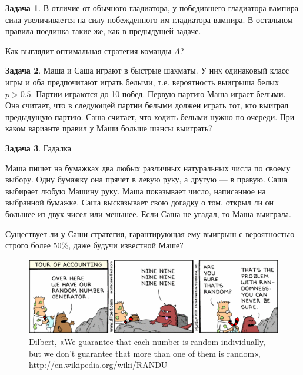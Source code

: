 \documentclass[nobib]{tufte-handout}
\theoremstyle{definition}
\newtheorem{problem}{Задача}
\begin{document}
\begin{problem}
В отличие от обычного гладиатора, у победившего гладиатора-вампира сила увеличивается на силу побежденного им гладиатора-вампира. В остальном правила поединка такие же, как в предыдущей задаче.

Как выглядит оптимальная стратегия команды $A$?

\end{problem}


\begin{problem}
Маша и Саша играют в быстрые шахматы. У них одинаковый класс игры и оба предпочитают играть белыми, т.е. вероятность выигрыша белых  $p>0.5$. Партии играются до 10 побед. Первую партию Маша играет белыми. Она считает, что в следующей партии белыми должен играть тот, кто выиграл предыдущую партию. Саша считает, что ходить белыми нужно по очереди. При каком варианте правил у Маши больше шансы выиграть?

\end{problem}


\begin{problem}
Гадалка

Маша пишет на бумажках два любых различных натуральных числа по своему выбору. Одну бумажку она прячет в левую руку, а другую — в правую. Саша выбирает любую Машину руку. Маша показывает число, написанное на выбранной бумажке. Саша высказывает свою догадку о том, открыл ли он большее из двух чисел или меньшее. Если Саша не угадал, то Маша выиграла.

Существует ли у Саши стратегия, гарантирующая ему выигрыш с вероятностью строго более 50\%, даже будучи известной Маше?

\begin{figure}
  \includegraphics[width=17cm]{images/ninenine.png}
  \caption{Dilbert, «We guarantee that each number is random individually, but we don't guarantee that more than one of them is random», \url{http://en.wikipedia.org/wiki/RANDU}}
\end{figure}


\end{problem}
\end{document}
